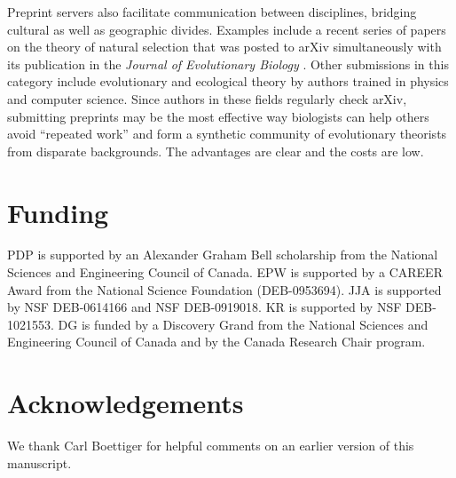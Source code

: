 \documentclass[letterpaper,twocolumn,superscriptaddress,showkeys,longbibliography]{revtex4-1}
\begin{document}
Preprint servers also facilitate communication between disciplines, bridging
cultural as well as geographic divides. Examples include a recent series of
papers on the theory of natural selection that was posted to arXiv
simultaneously with its publication in the \emph{Journal of Evolutionary
Biology} \cite{JEB:JEB2431,JEB:JEB2498,JEB:JEB2378,JEB:JEB2373}. Other
submissions in this category include evolutionary and ecological theory by
authors trained in physics and computer science.  Since authors in these fields
regularly check arXiv, submitting preprints may be the most effective way
biologists can help others avoid ``repeated work'' \cite{de2011contribution} and
form a synthetic community of evolutionary theorists from disparate backgrounds.
The advantages are clear and the costs are low.

\section{Funding}

PDP is supported by an Alexander Graham Bell scholarship from the National
Sciences and Engineering Council of Canada. EPW is supported by a CAREER Award
from the National Science Foundation (DEB-0953694). JJA is supported by NSF
DEB-0614166 and NSF DEB-0919018. KR is supported by NSF DEB-1021553. DG is
funded by a Discovery Grand from the National Sciences and Engineering Council
of Canada and by the Canada Research Chair program.

\section{Acknowledgements}

We thank Carl Boettiger for helpful comments on an earlier version of this
manuscript.

\newpage

\end{document}
